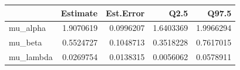 
\begin{tabular}{lrrrr}
\toprule
  & Estimate & Est.Error & Q2.5 & Q97.5\\
\midrule
mu\_alpha & 1.9070619 & 0.0996207 & 1.6403369 & 1.9966294\\
mu\_beta & 0.5524727 & 0.1048713 & 0.3518228 & 0.7617015\\
mu\_lambda & 0.0269754 & 0.0138315 & 0.0056062 & 0.0578911\\
\bottomrule
\end{tabular}
